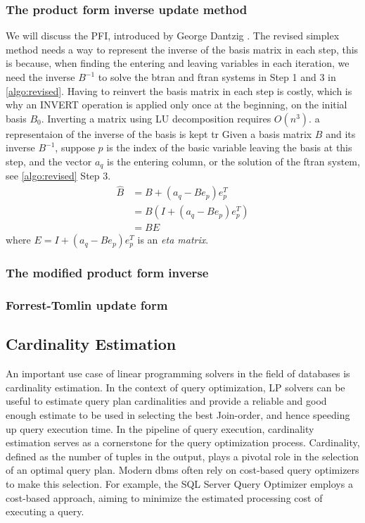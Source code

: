 \subsubsection*{The product form inverse update method}
We will discuss the PFI, introduced by George Dantzig \parencite{dantzig1954product}.
The revised simplex method needs a way to represent the inverse of the
basis matrix in each step, this is because, when
finding the entering and leaving variables in each iteration,
we need the inverse $B^{-1}$ to solve the \gls{btran}
and \gls{ftran} systems in Step 1 and 3 in \ref{algo:revised}.
Having to reinvert the basis matrix in each step is costly, which is why
an INVERT operation is applied only once at the beginning, on the initial basis
$B_0$. Inverting a matrix using LU decomposition requires $O(n^3)$.
a representaion of the inverse of the basis is kept tr
Given a basis matrix \( B \) and its inverse \( B^{-1} \),
suppose $p$ is the index of the basic variable leaving the basis at this step,
and the vector $a_q$ is the entering column, or the solution of the \gls{ftran}
system, see \ref{algo:revised} Step 3.
\begin{align*}
    \hat{B} & = B + (a_q - B e_p) e_p^T     \\
            & = B (I + (a_q - B e_p) e_p^T) \\
            & = B E
\end{align*}
where \( E = I + (a_q - B e_p) e_p^T \) is an \textit{eta matrix}.


\subsubsection*{The modified product form inverse}

\subsubsection*{Forrest-Tomlin update form}

\subsection{Cardinality Estimation}\label{subsection:cardinality-estimate}
An important use case of linear programming solvers in the field of databases is
cardinality estimation.
In the context of query optimization, LP solvers can be useful to estimate query plan
cardinalities and provide a reliable and good enough estimate to be used in selecting
the best Join-order, and hence speeding up query execution time.
In the pipeline of query execution, cardinality estimation serves
as a cornerstone for the query optimization process.
Cardinality, defined as the number of tuples in the output,
plays a pivotal role in the selection of an optimal query plan.
Modern \gls{dbms} often rely on
cost-based query optimizers to make this selection.
For example, the SQL Server Query Optimizer
\parencite{microsoft2023cardinality} employs a
cost-based approach, aiming to minimize the estimated
processing cost of executing a query.

